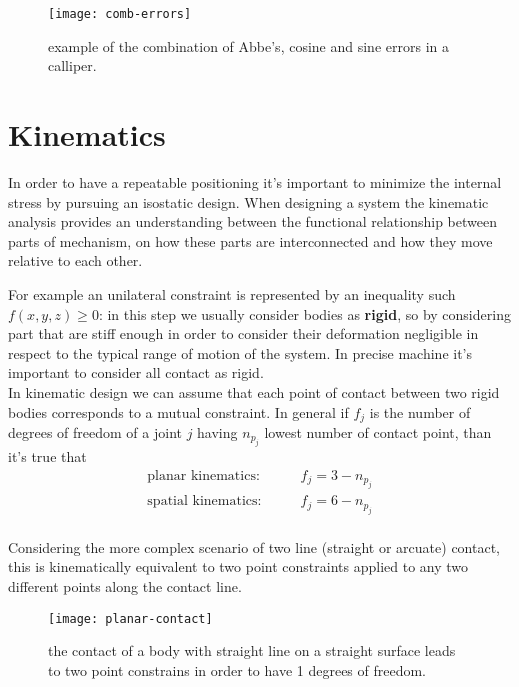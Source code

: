 	\begin{figure}[bht]
		\centering
		\texttt{[image: comb-errors]}
		\caption{example of the combination of Abbe's, cosine and sine errors in a calliper.}
	\end{figure}
	
\section{Kinematics}
	
	In order to have a repeatable positioning it's important to minimize the internal stress by pursuing an isostatic design. When designing a system the kinematic analysis provides an understanding between the functional relationship between parts of mechanism, on how these parts are interconnected and how they move relative to each other.
	
	For example an unilateral constraint is represented by an inequality such $f(x,y,z) \geq 0$: in this step we usually consider bodies as \textbf{rigid}, so by considering part that are stiff enough in order to consider their deformation negligible in respect to the typical range of motion of the system. In precise machine it's important to consider all contact as rigid. \\
	In kinematic design we can assume that each	point of contact between two rigid bodies corresponds to a mutual constraint. In general if $f_j$ is the number of degrees of freedom of a joint $j$ having $n_{p_j}$ lowest number of contact point, than it's true that
	\begin{equation}
	\begin{split}
		\textrm{planar kinematics:}& \qquad f_j = 3 - n_{p_j} \\
		\textrm{spatial kinematics:}& \qquad f_j = 6 - n_{p_j} \\
	\end{split}
	\end{equation}
	
	Considering the more complex scenario of two line (straight or arcuate) contact, this is kinematically equivalent to two point constraints applied to any two different points along the contact line. 
	
	\begin{SCfigure}[2][bht]
		\centering
		\texttt{[image: planar-contact]}
		\caption{the contact of a body with straight line on a straight surface leads to two point constrains in order to have 1 degrees of freedom.}
	\end{SCfigure}
	
